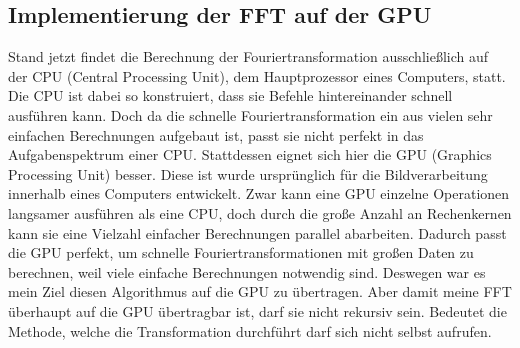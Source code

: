 \documentclass[a4paper,12pt]{article}
\theoremstyle{definition}
\theoremstyle{remark}
\begin{document}
\subsection{Implementierung der FFT auf der GPU}
Stand jetzt findet die Berechnung der Fouriertransformation ausschließlich auf der CPU (Central Processing Unit), dem Hauptprozessor eines Computers, statt.
Die CPU ist dabei so konstruiert, dass sie Befehle hintereinander schnell ausführen kann. Doch da die schnelle Fouriertransformation 
ein aus vielen sehr einfachen Berechnungen aufgebaut ist, passt sie nicht perfekt in das Aufgabenspektrum einer CPU. Stattdessen 
eignet sich hier die GPU (Graphics Processing Unit) besser. Diese ist wurde ursprünglich für die Bildverarbeitung innerhalb eines Computers entwickelt. 
Zwar kann eine GPU einzelne Operationen langsamer ausführen als eine CPU, doch durch die große Anzahl an Rechenkernen kann 
sie eine Vielzahl einfacher Berechnungen parallel abarbeiten. Dadurch passt die GPU perfekt, um schnelle Fouriertransformationen mit großen Daten 
zu berechnen, weil viele einfache Berechnungen notwendig sind. Deswegen war es mein Ziel diesen Algorithmus auf die GPU zu 
übertragen. Aber damit meine FFT überhaupt auf die GPU übertragbar ist, darf sie nicht rekursiv sein. Bedeutet die Methode, 
welche die Transformation durchführt darf sich nicht selbst aufrufen. 
\end{document}
